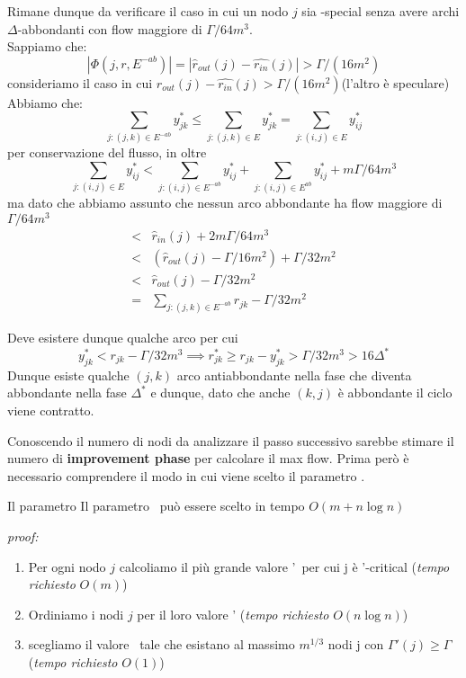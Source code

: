     Rimane dunque da verificare il caso in cui un nodo $j$ sia \gmm-special senza avere archi $\Delta$-abbondanti con flow maggiore di $\Gamma/64m^3$.\\
    Sappiamo che:
    \[|\Phi (j, r, E^{-ab})| = |\hat{r}_{out}(j)-\hat{r_{in}}(j)|> \Gamma/(16m^2) \]
    consideriamo il caso in cui $\hat{r}_{out}(j)-\hat{r_{in}}(j)> \Gamma/(16m^2)$(l'altro è speculare)
    Abbiamo che:
    \[\sum_{j:(j,k)\in E^{-ab}}y^*_{jk} \le \sum_{j:(j,k)\in E}y^*_{jk} = \sum_{j:(i,j)\in E}y^*_{ij}\]
    per conservazione del flusso, in oltre 
    \[\sum_{j:(i,j)\in E}y^*_{ij} < \sum_{j:(i,j)\in E^{-ab}}y^*_{ij} + \sum_{j:(i,j)\in E^{ab}}y^*_{ij}+ m\Gamma/64m^3\]
    ma dato che abbiamo assunto che nessun arco abbondante ha flow maggiore di $\Gamma/64m^3$
    \[\begin{array}{rl}
        < & \hat{r}_{in}(j) + 2m\Gamma/64m^3\\
        < & (\hat{r}_{out}(j) - \Gamma/16m^2) + \Gamma/32m^2\\
        < & \hat{r}_{out}(j) - \Gamma/32m^2\\
        = & \sum_{j:(j,k)\in E^{-ab}}r_{jk} - \Gamma/32m^2
    \end{array}\]

    Deve esistere dunque qualche arco per cui 
    \[y^*_{jk}<r_{jk}-\Gamma/32m^3\implies r^*_{jk}\ge r_{jk}-y^*_{jk}>\Gamma/32m^3>16\Delta^*\]
    Dunque esiste qualche $(j,k)$ arco antiabbondante nella fase \dlt che diventa abbondante nella 
    fase $\Delta^*$ e dunque, dato che anche $(k,j)$ è abbondante il ciclo viene contratto.\QED


Conoscendo il numero di nodi da analizzare il passo successivo sarebbe stimare il numero di \textbf{improvement phase} per calcolare il max flow. 
Prima però è necessario comprendere il modo in cui viene scelto il parametro \gmm.

\begin{lemma}[label = gammchose]{Il parametro \gmm}{}
    Il parametro \gmm\ può essere scelto in tempo $O(m+n\log n)$
\end{lemma}
\textit{proof:}\\
    \begin{enumerate}
        \item Per ogni nodo $j$ calcoliamo il più grande valore \gmm'\ per cui j è \gmm'-critical (\textit{tempo richiesto} $O(m)$)
        \item Ordiniamo i nodi $j$ per il loro valore \gmm' (\textit{tempo richiesto }$O(n\log n)$)
        \item scegliamo il valore \gmm\ tale che esistano al massimo $m^{1/3}$ nodi j con $\Gamma'(j)\ge \Gamma$ (\textit{tempo richiesto }$O(1)$)
    \end{enumerate}
    \QED



